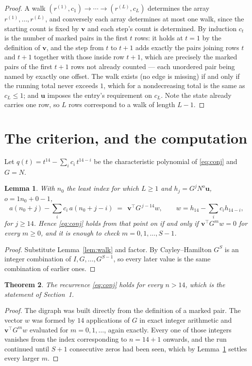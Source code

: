 \documentclass[11pt,a4paper]{article}
\theoremstyle{plain}
\newtheorem{theorem}{Theorem}
\newtheorem{lemma}[theorem]{Lemma}
\theoremstyle{definition}
\begin{document}
\begin{proof}
A walk $(r^{(1)},c_1)\to\cdots\to(r^{(L)},c_L)$ determines the array
$r^{(1)},\dots,r^{(L)}$, and conversely each array determines at most one walk, since the
starting count is fixed by $\mathbf{v}$ and each step's count is determined. By induction
$c_t$ is the number of marked pairs in the first $t$ rows: it holds at $t=1$ by the
definition of $\mathbf{v}$, and the step from $t$ to $t+1$ adds exactly the pairs joining
rows $t$ and $t+1$ together with those inside row $t+1$, which are precisely the marked
pairs of the first $t+1$ rows not already counted --- each unordered pair being named by
exactly one offset. The walk exists (no edge is missing) if and only if the running total
never exceeds $1$, which for a nondecreasing total is the same as $c_L\le1$; and
$\mathbf{u}$ imposes the entry's requirement on $c_L$. Note the state already carries one
row, so $L$ rows correspond to a walk of length $L-1$.
\end{proof}

\section{The criterion, and the computation}

Let $q(t)=t^{14}-\sum_i c_i\,t^{14-i}$ be the characteristic polynomial of
\eqref{eq:conj} and $G=N$.

\begin{lemma}\label{lem:crit}
With $n_0$ the least index for which $L\ge1$ and $h_j=G^{j}N^{o}\mathbf{u}$,
$o=1n_0+0-1$,
\[
a(n_0+j)-\sum_i c_i\,a(n_0+j-i)\;=\;\,\mathbf{v}^{\!\top}G^{\,j-14}w,
\qquad w=h_{14}-\sum_i c_i h_{14-i},
\]
for $j\ge14$. Hence \eqref{eq:conj} holds from that point on if and only if
$\mathbf{v}^{\!\top}G^{m}w=0$ for every $m\ge0$, and it is enough to check
$m=0,1,\dots,S-1$.
\end{lemma}

\begin{proof}
Substitute Lemma~\ref{lem:walk} and factor. By Cayley--Hamilton $G^{S}$ is an integer
combination of $I,G,\dots,G^{S-1}$, so every later value is the same combination of earlier
ones.
\end{proof}

\begin{theorem}
The recurrence \eqref{eq:conj} holds for every $n>14$, which is the statement of
Section~1.
\end{theorem}

\begin{proof}
The digraph was built directly from the definition of a marked pair. The vector $w$ was
formed by $14$ applications of $G$ in exact integer arithmetic and
$\mathbf{v}^{\!\top}G^{m}w$ evaluated for $m=0,1,\dots$, again exactly. Every one of
those integers vanishes from the index corresponding to $n=14+1$ onwards, and the run
continued until $S+1$ consecutive zeros had been seen, which by Lemma~\ref{lem:crit}
settles every larger $m$.
\end{proof}
\end{document}
